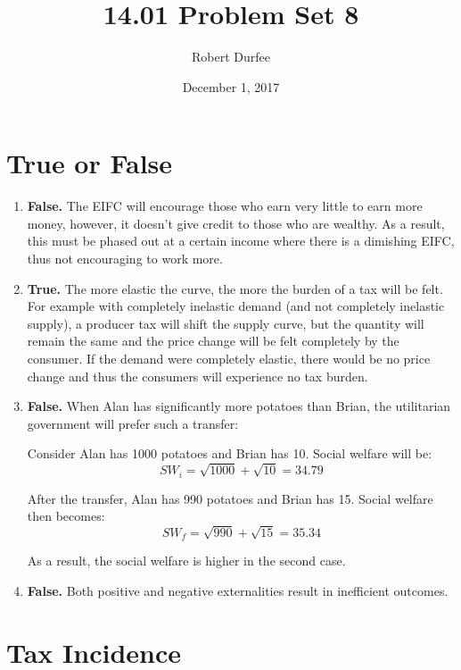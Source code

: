 \documentclass{article}
\title{ 14.01 Problem Set 8 }
\author{ Robert Durfee }
\date{ December 1, 2017 }
\begin{document}
\maketitle

\section{ True or False }

\begin{enumerate}[1.]
    \item \textbf{False.} The EIFC will encourage those who earn very little to
        earn more money, however, it doesn't give credit to those who are
        wealthy. As a result, this must be phased out at a certain income where
        there is a dimishing EIFC, thus not encouraging to work more.

    \item \textbf{True.} The more elastic the curve, the more the burden of a
        tax will be felt. For example with completely inelastic demand (and not
        completely inelastic supply), a producer tax will shift the supply
        curve, but the quantity will remain the same and the price change will
        be felt completely by the consumer. If the demand were completely
        elastic, there would be no price change and thus the consumers will
        experience no tax burden.

    \item \textbf{False.} When Alan has significantly more potatoes than Brian,
        the utilitarian government will prefer such a transfer:

        Consider Alan has 1000 potatoes and Brian has 10. Social welfare will
        be:
        $$ SW_{i} = \sqrt{ 1000 } + \sqrt{ 10 } = 34.79 $$

        After the transfer, Alan has 990 potatoes and Brian has 15. Social
        welfare then becomes:
        $$ SW_{f} = \sqrt{ 990 } + \sqrt{ 15 } = 35.34 $$

        As a result, the social welfare is higher in the second case.

    \item \textbf{False.} Both positive and negative externalities result in
        inefficient outcomes.

\end{enumerate}

\section{ Tax Incidence }
\end{document}
